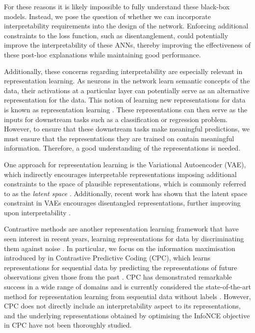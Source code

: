 For these reasons it is likely impossible to fully understand these black-box models. Instead, we pose the question of whether we can incorporate interpretability requirements into the design of the network. Enforcing additional constraints to the loss function, such as disentanglement, could potentially improve the interpretability of these ANNs, thereby improving the effectiveness of these post-hoc explanations while maintaining good performance.


Additionally, these concerns regarding interpretability are especially relevant in representation learning. As neurons in the network learn semantic concepts of the data, their activations at a particular layer can potentially serve as an alternative representation for the data. This notion of learning new representations for data is known as representation learning \citep{le-khacContrastiveRepresentationLearning2020}. These representations can then serve as the inputs for downstream tasks such as a classification or regression problem. However, to ensure that these downstream tasks make meaningful predictions, we must ensure that the representations they are trained on contain meaningful information. Therefore, a good understanding of the representations is needed.


One approach for representation learning is the Variational Autoencoder (VAE), which indirectly encourages interpretable representations imposing additional constraints to the space of plausible representations, which is commonly referred to as the \textit{latent space} \citep{kingmaAutoEncodingVariationalBayes2022}. Additionally, recent work has shown that the latent space constraint in VAEs encourages disentangled representations, further improving upon interpretability \citep{burgessUnderstandingDisentanglingBeta2018, sikkaCloserLookDisentangling2019, higginsBetaVAELearningBasic2022}.

Contrastive methods are another representation learning framework that have seen interest in recent years, learning representations for data by discriminating them against noise \citep{chenSimpleFrameworkContrastive2020}. In particular, we focus on the information maximisation introduced by \cite{oordRepresentationLearningContrastive2019} in Contrastive Predictive Coding (CPC), which learns representations for sequential data by predicting the representations of future observations given those from the past \cite{henaffDataEfficientImageRecognition2020}. CPC has demonstrated remarkable success in a wide range of domains and is currently considered the state-of-the-art method for representation learning from sequential data without labels \citep{stackeEvaluationContrastivePredictive2020, dehaanContrastivePredictiveCoding2021, luSemiSupervisedHistologyClassification2019, bhatiSegmentalContrastivePredictive2021, deldariTimeSeriesChange2021, henaffDataEfficientImageRecognition2020}. However, CPC does not directly include an interpretability aspect to its representations, and the underlying representations obtained by optimising the InfoNCE objective in CPC have not been thoroughly studied.



